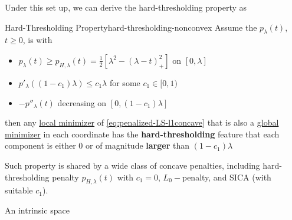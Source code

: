\documentclass[twoside]{article}
\begin{document}
Under this set up, we can derive the hard-thresholding property as 
\begin{proposition}{Hard-Thresholding Property}{hard-thresholding-nonconvex}
    Assume the $p_{\lambda}(t)$, $t\geq 0$, is  with 
    \begin{itemize}
        \item $p_{\lambda}(t)\geq p_{H,\lambda}(t) = \frac{1}{2}\left[\lambda^2-(\lambda-t)^2_+\right]$ on $[0,\lambda]$
        \item $p'_{\lambda}\left((1-c_1)\lambda\right)\leq c_1\lambda$ for some $c_1\in [0,1)$
        \item $-p''_{\lambda}(t)$ decreasing on $[0,(1-c_1)\lambda]$
    \end{itemize}
    then any \underline{local minimizer} of \ref{eq:penalized-LS-l1concave} that is also a \underline{global minimizer} in each coordinate has the \textbf{{hard-thresholding}} feature that each component is either $0$ or of magnitude \textbf{larger} than $(1-c_1)\lambda$
\end{proposition}
Such property is shared by a wide class of concave penalties, including hard-thresholding penalty $p_{H,\lambda}(t)$ with $c_1=0$, $L_0-$penalty, and SICA (with suitable $c_1$).

An intrinsic space 

%
%
\end{document}
